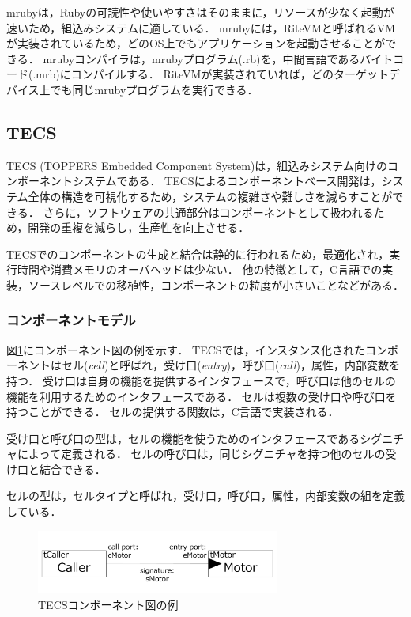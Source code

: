 \documentclass[submit,techrep]{ipsj}
\begin{document}
mrubyは，Rubyの可読性や使いやすさはそのままに，リソースが少なく起動が速いため，組込みシステムに適している．
mrubyには，RiteVMと呼ばれるVMが実装されているため，どのOS上でもアプリケーションを起動させることができる．
mrubyコンパイラは，mrubyプログラム(.rb)を，中間言語であるバイトコード(.mrb)にコンパイルする．
RiteVMが実装されていれば，どのターゲットデバイス上でも同じmrubyプログラムを実行できる．


\subsection{TECS}
TECS (TOPPERS Embedded Component System)は，組込みシステム向けのコンポーネントシステムである．
TECSによるコンポーネントベース開発は，システム全体の構造を可視化するため，システムの複雑さや難しさを減らすことができる．
さらに，ソフトウェアの共通部分はコンポーネントとして扱われるため，開発の重複を減らし，生産性を向上させる．

TECSでのコンポーネントの生成と結合は静的に行われるため，最適化され，実行時間や消費メモリのオーバヘッドは少ない．
他の特徴として，C言語での実装，ソースレベルでの移植性，コンポーネントの粒度が小さいことなどがある．

\subsubsection{コンポーネントモデル}
図\ref{fig:component}にコンポーネント図の例を示す．
TECSでは，インスタンス化されたコンポーネントはセル({\it cell})と呼ばれ，受け口({\it entry})，呼び口({\it call})，属性，内部変数を持つ．
受け口は自身の機能を提供するインタフェースで，呼び口は他のセルの機能を利用するためのインタフェースである．
セルは複数の受け口や呼び口を持つことができる．
セルの提供する関数は，C言語で実装される．

受け口と呼び口の型は，セルの機能を使うためのインタフェースであるシグニチャによって定義される．
セルの呼び口は，同じシグニチャを持つ他のセルの受け口と結合できる．

セルの型は，セルタイプと呼ばれ，受け口，呼び口，属性，内部変数の組を定義している．

\begin{figure}[t]
    \centering
    \includegraphics[width=8cm,clip]{../EMSOFT2016/figure/component_diagram.pdf}
    \caption{TECSコンポーネント図の例}
    \label{fig:component}
\end{figure}
\end{document}
